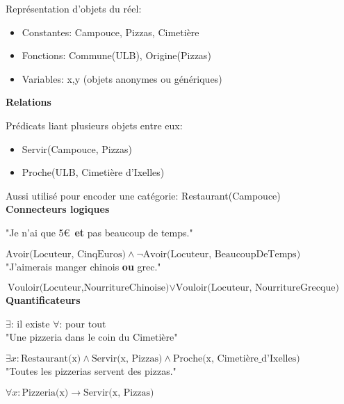 Représentation d'objets du réel:

\begin{itemize}
    \item Constantes: Campouce, Pizzas, Cimetière
    \item Fonctions: Commune(ULB), Origine(Pizzas)
    \item Variables: x,y (objets anonymes ou génériques)\\
\end{itemize}

\textbf{Relations}

Prédicats liant plusieurs objets entre eux:

\begin{itemize}
    \item Servir(Campouce, Pizzas)
    \item Proche(ULB, Cimetière d'Ixelles)\\
\end{itemize}

Aussi utilisé pour encoder une catégorie: Restaurant(Campouce)\\

\textbf{Connecteurs logiques}

"Je n'ai que 5\euro \ \textbf{et} pas beaucoup de temps."

$ \text{Avoir(Locuteur, CinqEuros)} \land \neg \text{Avoir(Locuteur, BeaucoupDeTemps)}$ \\

"J'aimerais manger chinois \textbf{ou} grec."

$ \text{Vouloir(Locuteur,NourritureChinoise)} \lor \text{Vouloir(Locuteur, NourritureGrecque)}$ \\

\textbf{Quantificateurs}

\hspace{2cm} $\exists \text{: il existe}$ \hspace{2cm} $\forall \text{: pour tout}$\\

"Une pizzeria dans le coin du Cimetière"

$\exists x: \text{Restaurant(x)} \land \text{Servir(x, Pizzas)} \land \text{Proche(x, Cimetière\_d'Ixelles)}$\\

"Toutes les pizzerias servent des pizzas."

$ \forall x: \text{Pizzeria(x)} \rightarrow \text{Servir(x, Pizzas)} $ \\

